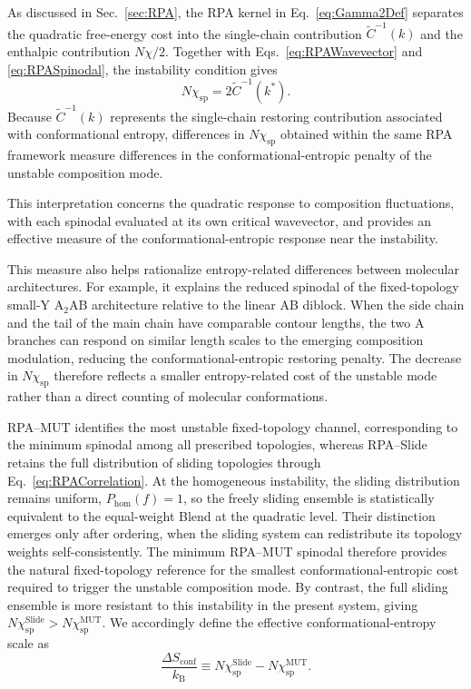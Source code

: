 \documentclass[journal=mamobx,manuscript=article]{achemso}
\begin{document}
As discussed in Sec.~\ref{sec:RPA}, the RPA kernel in Eq.~\eqref{eq:Gamma2Def} separates the quadratic free-energy cost into the single-chain contribution $\widetilde C^{-1}(k)$ and the enthalpic contribution $N\chi/2$.
Together with Eqs.~\eqref{eq:RPAWavevector} and \eqref{eq:RPASpinodal}, the instability condition gives
\begin{equation}
    N\chi_{\mathrm{sp}}
    =
    2\widetilde C^{-1}(k^\ast).
\end{equation}
Because $\widetilde C^{-1}(k)$ represents the single-chain restoring contribution associated with conformational entropy, differences in $N\chi_{\mathrm{sp}}$ obtained within the same RPA framework measure differences in the conformational-entropic penalty of the unstable composition mode.\cite{Matsen1996Unifying,Sides2004Continuous,Wang2008Microphase}

This interpretation concerns the quadratic response to composition fluctuations, with each spinodal evaluated at its own critical wavevector, and provides an effective measure of the conformational-entropic response near the instability.

This measure also helps rationalize entropy-related differences between molecular architectures.
For example, it explains the reduced spinodal of the fixed-topology small-Y A$_2$AB architecture relative to the linear AB diblock.\cite{Zhao2024Phase}
When the side chain and the tail of the main chain have comparable contour lengths, the two A branches can respond on similar length scales to the emerging composition modulation, reducing the conformational-entropic restoring penalty.
The decrease in $N\chi_{\mathrm{sp}}$ therefore reflects a smaller entropy-related cost of the unstable mode rather than a direct counting of molecular conformations.


RPA--MUT identifies the most unstable fixed-topology channel, corresponding to the minimum spinodal among all prescribed topologies, whereas RPA--Slide retains the full distribution of sliding topologies through Eq.~\eqref{eq:RPACorrelation}.
At the homogeneous instability, the sliding distribution remains uniform, $P_{\mathrm{hom}}(f)=1$, so the freely sliding ensemble is statistically equivalent to the equal-weight Blend at the quadratic level.
Their distinction emerges only after ordering, when the sliding system can redistribute its topology weights self-consistently.
The minimum RPA--MUT spinodal therefore provides the natural fixed-topology reference for the smallest conformational-entropic cost required to trigger the unstable composition mode.
By contrast, the full sliding ensemble is more resistant to this instability in the present system, giving $N\chi_{\mathrm{sp}}^{\mathrm{Slide}}>N\chi_{\mathrm{sp}}^{\mathrm{MUT}}$.
We accordingly define the effective conformational-entropy scale as
\begin{equation}
    \frac{\Delta S_{\mathrm{conf}}}{k_{\mathrm B}}
    \equiv
    N\chi_{\mathrm{sp}}^{\mathrm{Slide}}
    -
    N\chi_{\mathrm{sp}}^{\mathrm{MUT}}.
    \label{eq:ConfEntropy}
\end{equation}
\end{document}
